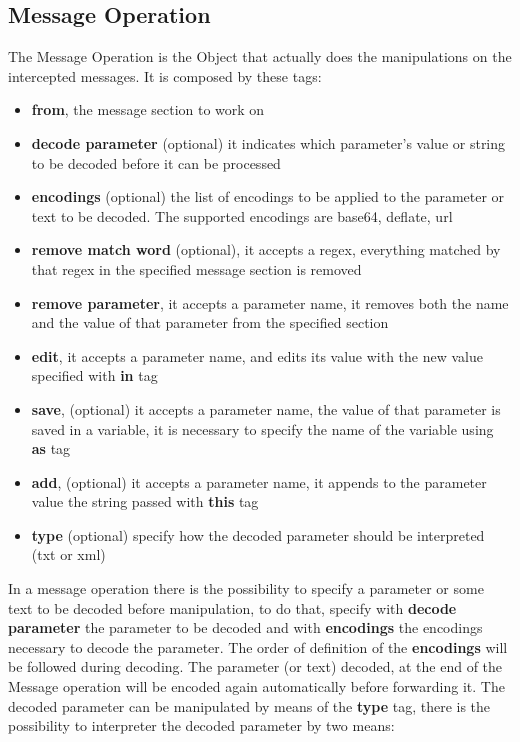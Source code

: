 \subsection{Message Operation}
The Message Operation is the Object that actually does the manipulations on the intercepted messages. It is composed by these tags:
\begin{itemize}
    \item \textbf{from}, the message section to work on
    \item \textbf{decode parameter} (optional) it indicates which parameter's value or string to be decoded before it can be processed
    \item \textbf{encodings} (optional) the list of encodings to be applied to the parameter or text to be decoded. The supported encodings are base64, deflate, url
    \item \textbf{remove match word} (optional), it accepts a regex, everything matched by that regex in the specified message section is removed
    \item \textbf{remove parameter}, it accepts a parameter name, it removes both the name and the value of that parameter from the specified section
    \item \textbf{edit}, it accepts a parameter name, and edits its value with the new value specified with \textbf{in} tag
    \item \textbf{save}, (optional) it accepts a parameter name, the value of that parameter is saved in a variable, it is necessary to specify the name of the variable using \textbf{as} tag
    \item \textbf{add}, (optional) it accepts a parameter name, it appends to the parameter value the string passed with \textbf{this} tag
    \item \textbf{type} (optional) specify how the decoded parameter should be interpreted (txt or xml)
\end{itemize}

In a message operation there is the possibility to specify a parameter or some text to be decoded before manipulation, to do that, specify with \textbf{decode parameter} the parameter to be decoded and with \textbf{encodings} the encodings necessary to decode the parameter. The order of definition of the \textbf{encodings} will be followed during decoding. The parameter (or text) decoded, at the end of the Message operation will be encoded again automatically before forwarding it.
The decoded parameter can be manipulated by means of the \textbf{type} tag, there is the possibility to interpreter the decoded parameter by two means: 

